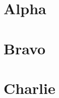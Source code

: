 \newpage
\appendix
\addappheadtotoc
\renewcommand{\thesection}{\Alph{section}}
\section{Alpha}
\section{Bravo}
\section{Charlie}

   